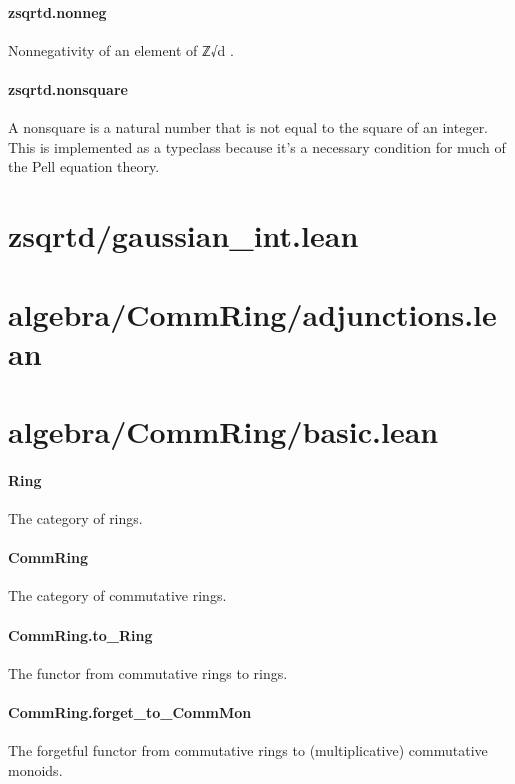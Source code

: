 \documentclass{article}
\begin{document}
\paragraph{zsqrtd.nonneg}
\par
Nonnegativity of an element of 
\colorbox[RGB]{253,246,227}{{{{\color[RGB]{101, 123, 131} ℤ√d }}}}.
\paragraph{zsqrtd.nonsquare}
\par
A nonsquare is a natural number that is not equal to the square of an
integer. This is implemented as a typeclass because it's a necessary condition
for much of the Pell equation theory.
\section{zsqrtd/gaussian\_int.lean}\section{algebra/CommRing/adjunctions.lean}\section{algebra/CommRing/basic.lean}\paragraph{Ring}
\par
The category of rings.
\paragraph{CommRing}
\par
The category of commutative rings.
\paragraph{CommRing.to\_Ring}
\par
The functor from commutative rings to rings.
\paragraph{CommRing.forget\_to\_CommMon}
\par
The forgetful functor from commutative rings to (multiplicative) commutative monoids.
\end{document}
